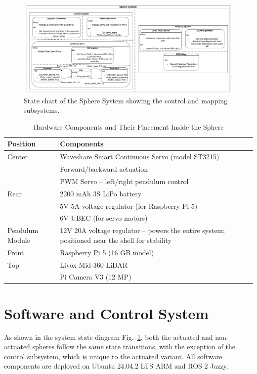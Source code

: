 \documentclass[conference]{IEEEtran}
\begin{document}
\begin{figure}
    \centering
    \includegraphics[width=1\linewidth]{pics/Khonsu.pdf} 
    \caption{State chart of the Sphere System showing the control and mapping subsystems.}
    \label{fig:sphere_system}
\end{figure}

\begin{table}
\centering
\caption{Hardware Components and Their Placement Inside the Sphere}
\label{tab:hardware_components_actuated}
\begin{tabularx}{\linewidth}{@{}l X@{}}
\toprule
\textbf{Position} & \textbf{Components} \\
\midrule
Center & Waveshare Smart Continuous Servo (model ST3215) \\
       & Forward/backward actuation \\
       & PWM Servo – left/right pendulum control \\
Rear   & 2200 mAh 3S LiPo battery \\
       & 5V 5A voltage regulator (for Raspberry Pi 5) \\
       & 6V UBEC (for servo motors) \\
Pendulum Module & 12V 20A voltage regulator – powers the entire system; positioned near the shell for stability \\
Front  & Raspberry Pi 5 (16 GB model) \\
Top    & Livox Mid-360 LiDAR \\
       & Pi Camera V3 (12 MP) \\
\bottomrule
\end{tabularx}
\end{table}

\section{Software and Control System}

As shown in the system state diagram Fig.~\ref{fig:sphere_system}, both the actuated and non-actuated spheres follow the same state transitions, with the exception of the control subsystem, which is unique to the actuated variant. 
All software components are deployed on Ubuntu 24.04.2 LTS ARM and ROS 2 Jazzy.
\end{document}
